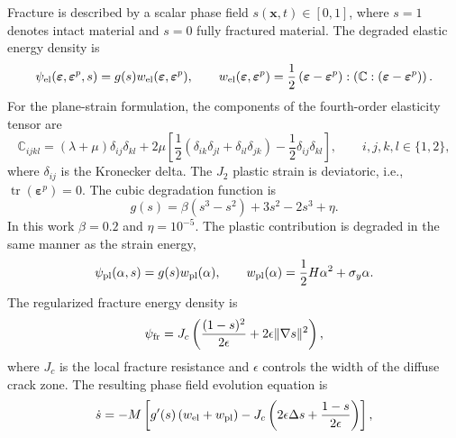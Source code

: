 \documentclass[pamm,a4paper,fleqn]{w-art}
\begin{document}
Fracture is described by a scalar phase field
\(s(\boldsymbol{x},t)\in[0,1]\), where \(s=1\) denotes intact
material and \(s=0\) fully fractured material. The degraded elastic
energy density is
\begin{equation}
  \psi_{\rm el}(
  \boldsymbol{\varepsilon},
  \boldsymbol{\varepsilon}^p,
  s)
  = g(s)w_{\rm el}(
  \boldsymbol{\varepsilon},
  \boldsymbol{\varepsilon}^p),
  \qquad
  w_{\rm el}(\boldsymbol{\varepsilon},\boldsymbol{\varepsilon}^p)
  = \frac{1}{2}
  \left(\boldsymbol{\varepsilon}-\boldsymbol{\varepsilon}^p\right)
  :
  \left(
  \boldsymbol{\mathbb{C}}:
  \left(
  \boldsymbol{\varepsilon}-\boldsymbol{\varepsilon}^p
  \right)
  \right).
\end{equation}
For the plane-strain formulation, the components of the fourth-order
elasticity tensor are
\begin{equation}
  \mathbb{C}_{ijkl}
  =(\lambda+\mu)\delta_{ij}\delta_{kl}
  +2\mu\left[
  \frac{1}{2}
  \left(\delta_{ik}\delta_{jl}+\delta_{il}\delta_{jk}\right)
  -\frac{1}{2}\delta_{ij}\delta_{kl}
  \right],
  \qquad i,j,k,l\in\{1,2\},
  \label{eq:plane_strain_elasticity_tensor}
\end{equation}
where \(\delta_{ij}\) is the Kronecker delta.
The \(J_2\) plastic strain is deviatoric, i.e.,
\(\operatorname{tr}(\boldsymbol{\varepsilon}^p)=0\).
The cubic degradation function is
\begin{equation}
  g(s)=\beta(s^3-s^2)+3s^2-2s^3+\eta .
  \label{eq:deg_grad}
\end{equation}
In this work \(\beta=0.2\) and \(\eta=10^{-5}\). The plastic
contribution is degraded in the same manner as the strain energy,
\begin{equation}
  \psi_{\rm pl}(\alpha,s)=g(s)w_{\rm pl}(\alpha),
  \qquad
  w_{\rm pl}(\alpha)=\frac{1}{2}H\alpha^2+\sigma_y\alpha .
\end{equation}
The regularized fracture energy density is
\begin{equation}
  \psi_{\rm fr}
  =J_c\left(
  \frac{(1-s)^2}{2\epsilon}
  +2\epsilon\|\nabla s\|^2
  \right),
\end{equation}
where \(J_c\) is the local fracture resistance and \(\epsilon\)
controls the width of the diffuse crack zone. The resulting phase
field evolution equation is
\begin{align}
  \dot{s}=-M\left[
    g'(s)\left(w_{\rm el}+w_{\rm pl}\right)
    -J_c\left(2\epsilon\Delta s+\frac{1-s}{2\epsilon}\right)
    \right],
  \label{eq:evolution_s}
\end{align}
\end{document}
